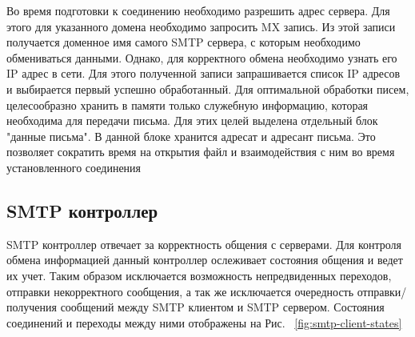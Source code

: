 \documentclass[a4paper,12pt]{report}
\begin{document}
Во время подготовки к соединению необходимо разрешить адрес сервера. Для этого для указанного домена необходимо запросить MX запись. Из этой записи получается доменное имя самого SMTP сервера, с которым необходимо обмениваться данными. Однако, для корректного обмена необходимо узнать его IP адрес в сети. Для этого полученной записи запрашивается список IP адресов и выбирается первый успешно обработанный. 
Для оптимальной обработки писем, целесообразно хранить в памяти только служебную информацию, которая необходима для передачи письма. Для этих целей выделена отдельный блок "данные письма". В данной блоке хранится адресат и адресант письма. Это позволяет сократить время на открытия файл и взаимодействия с ним во время установленного соединения

\subsection{SMTP контроллер}
SMTP контроллер отвечает за корректность общения с серверами. Для контроля обмена информацией данный контроллер ослеживает состояния общения и ведет их учет. Таким образом исключается возможность непредвиденных переходов, отправки некорректного сообщения, а так же исключается очередность отправки/получения сообщений между SMTP клиентом и SMTP сервером. Состояния соединений и переходы между ними отображены на Рис. ~\ref{fig:smtp-client-states}
\end{document}
